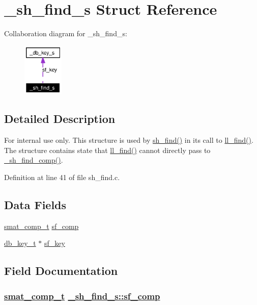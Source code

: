 \hypertarget{struct__sh__find__s}{
\section{\_\-sh\_\-find\_\-s Struct Reference}
\label{struct__sh__find__s}
}
Collaboration diagram for \_\-sh\_\-find\_\-s:\begin{figure}[H]
\begin{center}
\leavevmode
\includegraphics[width=55pt]{struct__sh__find__s__coll__graph}
\end{center}
\end{figure}


\subsection{Detailed Description}
\begin{Desc}
\item[For internal use only.]
This structure is used by \hyperlink{group__dbprim__smat_ga20}{sh\_\-find()} in its call to \hyperlink{group__dbprim__link_ga9}{ll\_\-find()}. The structure contains state that \hyperlink{group__dbprim__link_ga9}{ll\_\-find()} cannot directly pass to \hyperlink{group__dbprim__smat_ga27}{\_\-sh\_\-find\_\-comp()}.\end{Desc}




Definition at line 41 of file sh\_\-find.c.\subsection*{Data Fields}
\begin{CompactItemize}
\item 
\hyperlink{group__dbprim__smat_ga5}{smat\_\-comp\_\-t} \hyperlink{struct__sh__find__s_o0}{sf\_\-comp}
\item 
\hyperlink{struct__db__key__s}{db\_\-key\_\-t} $\ast$ \hyperlink{struct__sh__find__s_o1}{sf\_\-key}
\end{CompactItemize}


\subsection{Field Documentation}
\hypertarget{struct__sh__find__s_o0}{
\subsubsection[sf\_\-comp]{\setlength{\rightskip}{0pt plus 5cm}\hyperlink{group__dbprim__smat_ga5}{smat\_\-comp\_\-t} \hyperlink{struct__sh__find__s_o0}{\_\-sh\_\-find\_\-s::sf\_\-comp}}}
\label{struct__sh__find__s_o0}



